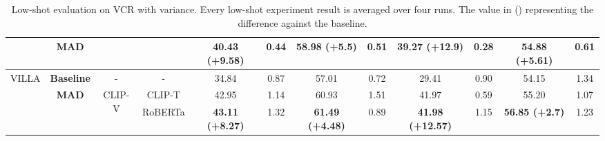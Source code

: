 \documentclass[runningheads]{llncs}
\begin{document}
\begin{table}[h!]
{\begin{tabular}{|c|c|cc|cccc|cccc|}
                                                                        & \textbf{MAD} & \multicolumn{1}{c|}{}                        &                         & \multicolumn{1}{c|}{\textbf{40.43 (+9.58)}} & \multicolumn{1}{c|}{0.44}    & \multicolumn{1}{c|}{\textbf{58.98 (+5.5)}}  & 0.51    & \multicolumn{1}{c|}{\textbf{39.27 (+12.9)}}  & \multicolumn{1}{c|}{0.28}    & \multicolumn{1}{c|}{\textbf{54.88 (+5.61)}} & 0.61    \\ \hline
\multirow{3}{*}{VILLA}                                                  & \textbf{Baseline}   & \multicolumn{1}{c|}{-}                       & -                       & \multicolumn{1}{c|}{34.84}                  & \multicolumn{1}{c|}{0.87}    & \multicolumn{1}{c|}{57.01}                  & 0.72    & \multicolumn{1}{c|}{29.41}                   & \multicolumn{1}{c|}{0.90}    & \multicolumn{1}{c|}{54.15}                  & 1.34    \\ \cline{2-12}
                                                                        & \textbf{MAD} & \multicolumn{1}{c|}{\multirow{2}{*}{CLIP-V}} & CLIP-T                  & \multicolumn{1}{c|}{42.95}                  & \multicolumn{1}{c|}{1.14}    & \multicolumn{1}{c|}{60.93}                  & 1.51    & \multicolumn{1}{c|}{41.97}                   & \multicolumn{1}{c|}{0.59}    & \multicolumn{1}{c|}{55.20}                  & 1.07    \\ \cline{2-2} \cline{4-12}
                                                                        & \textbf{}           & \multicolumn{1}{c|}{}                        & RoBERTa                 & \multicolumn{1}{c|}{\textbf{43.11 (+8.27)}} & \multicolumn{1}{c|}{1.32}    & \multicolumn{1}{c|}{\textbf{61.49 (+4.48)}} & 0.89    & \multicolumn{1}{c|}{\textbf{41.98 (+12.57)}} & \multicolumn{1}{c|}{1.15}    & \multicolumn{1}{c|}{\textbf{56.85 (+2.7)}}  & 1.23    \\ \hline
\end{tabular}}
\caption{Low-shot evaluation on VCR with variance. Every low-shot experiment result is averaged over four runs.  The value in () representing the difference against the baseline.}
\label{tab:vcrlowshot}
\end{table}
\end{document}
